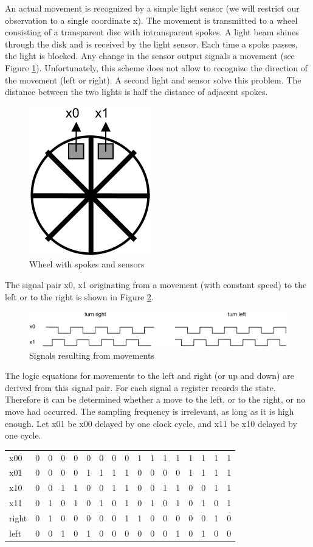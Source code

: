An actual movement is recognized by a simple light sensor (we will restrict our observation to a
single coordinate x). The movement is transmitted to a wheel consisting of a transparent disc with
intransparent spokes. A light beam shines through the disk and is received by the light sensor.
Each time a spoke passes, the light is blocked. Any change in the sensor output signals a
movement (see Figure \ref{fig:wheel}). Unfortunately, this scheme does not allow to recognize the direction
of the movement (left or right). A second light and sensor solve this problem. The distance between
the two lights is half the distance of adjacent spokes.
\begin{figure}[h!]
  \centering
  \includegraphics[width=.25\textwidth]{i/G/4.png}
  \caption{Wheel with spokes and sensors}
  \label{fig:wheel}
\end{figure}

The signal pair x0, x1 originating from a movement (with constant speed) to the left or to the right is
shown in Figure \ref{fig:sig}.
\begin{figure}[h!]
  \centering
  \includegraphics[width=\textwidth]{i/G/5.png}
  \caption{Signals resulting from movements}
  \label{fig:sig}
\end{figure}

The logic equations for movements to the left and right (or up and down) are derived from this signal
pair. For each signal a register records the state. Therefore it can be determined whether a move to
the left, or to the right, or no move had occurred. The sampling frequency is irrelevant, as long as it is
high enough. Let x01 be x00 delayed by one clock cycle, and x11 be x10 delayed by one cycle.
\begin{table}[h!]
  \centering
  \begin{tabular}{l  c c c c  c c c c  c c c c  c c c c}
    x00  & 0 & 0 & 0 & 0 & 0 & 0 & 0 & 0 & 1 & 1 & 1 & 1 & 1 & 1 & 1 & 1 \\
    x01  & 0 & 0 & 0 & 0 & 1 & 1 & 1 & 1 & 0 & 0 & 0 & 0 & 1 & 1 & 1 & 1 \\
    x10  & 0 & 0 & 1 & 1 & 0 & 0 & 1 & 1 & 0 & 0 & 1 & 1 & 0 & 0 & 1 & 1 \\
    x11  & 0 & 1 & 0 & 1 & 0 & 1 & 0 & 1 & 0 & 1 & 0 & 1 & 0 & 1 & 0 & 1 \\\hline
    right& 0 & 1 & 0 & 0 & 0 & 0 & 0 & 1 & 1 & 0 & 0 & 0 & 0 & 0 & 1 & 0 \\
    left & 0 & 0 & 1 & 0 & 1 & 0 & 0 & 0 & 0 & 0 & 0 & 1 & 0 & 1 & 0 & 0
  \end{tabular}
\end{table}

